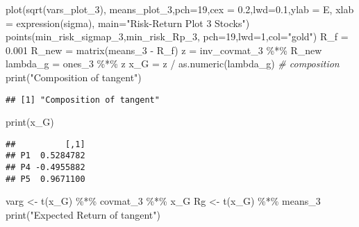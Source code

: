 \documentclass[
]{article}
\newenvironment{Shaded}{\begin{snugshade}}{\end{snugshade}}
\newcommand{\AttributeTok}[1]{\textcolor[rgb]{0.77,0.63,0.00}{#1}}
\newcommand{\CommentTok}[1]{\textcolor[rgb]{0.56,0.35,0.01}{\textit{#1}}}
\newcommand{\DecValTok}[1]{\textcolor[rgb]{0.00,0.00,0.81}{#1}}
\newcommand{\FloatTok}[1]{\textcolor[rgb]{0.00,0.00,0.81}{#1}}
\newcommand{\FunctionTok}[1]{\textcolor[rgb]{0.00,0.00,0.00}{#1}}
\newcommand{\NormalTok}[1]{#1}
\newcommand{\OtherTok}[1]{\textcolor[rgb]{0.56,0.35,0.01}{#1}}
\newcommand{\SpecialCharTok}[1]{\textcolor[rgb]{0.00,0.00,0.00}{#1}}
\newcommand{\StringTok}[1]{\textcolor[rgb]{0.31,0.60,0.02}{#1}}
\begin{document}
\begin{Shaded}
\begin{Highlighting}[]
\FunctionTok{plot}\NormalTok{(}\FunctionTok{sqrt}\NormalTok{(vars\_plot\_3), means\_plot\_3,}\AttributeTok{pch=}\DecValTok{19}\NormalTok{,}\AttributeTok{cex =} \FloatTok{0.2}\NormalTok{,}\AttributeTok{lwd=}\FloatTok{0.1}\NormalTok{,}\AttributeTok{ylab =} \StringTok{\textquotesingle{}E\textquotesingle{}}\NormalTok{, }\AttributeTok{xlab =} \FunctionTok{expression}\NormalTok{(sigma), }\AttributeTok{main=}\StringTok{"Risk{-}Return Plot 3 Stocks"}\NormalTok{) }
\FunctionTok{points}\NormalTok{(min\_risk\_sigmap\_3,min\_risk\_Rp\_3, }\AttributeTok{pch=}\DecValTok{19}\NormalTok{,}\AttributeTok{lwd=}\DecValTok{1}\NormalTok{,}\AttributeTok{col=}\StringTok{"gold"}\NormalTok{)}
\NormalTok{R\_f }\OtherTok{=} \FloatTok{0.001}
\NormalTok{R\_new }\OtherTok{=} \FunctionTok{matrix}\NormalTok{(means\_3 }\SpecialCharTok{{-}}\NormalTok{ R\_f)}
\NormalTok{z }\OtherTok{=}\NormalTok{ inv\_covmat\_3 }\SpecialCharTok{\%*\%}\NormalTok{ R\_new}
\NormalTok{lambda\_g }\OtherTok{=}\NormalTok{ ones\_3 }\SpecialCharTok{\%*\%}\NormalTok{ z}
\NormalTok{x\_G }\OtherTok{=}\NormalTok{ z }\SpecialCharTok{/} \FunctionTok{as.numeric}\NormalTok{(lambda\_g) }\CommentTok{\# composition}
\FunctionTok{print}\NormalTok{(}\StringTok{"Composition of tangent"}\NormalTok{)}
\end{Highlighting}
\end{Shaded}

\begin{verbatim}
## [1] "Composition of tangent"
\end{verbatim}

\begin{Shaded}
\begin{Highlighting}[]
\FunctionTok{print}\NormalTok{(x\_G)}
\end{Highlighting}
\end{Shaded}

\begin{verbatim}
##          [,1]
## P1  0.5284782
## P4 -0.4955882
## P5  0.9671100
\end{verbatim}

\begin{Shaded}
\begin{Highlighting}[]
\NormalTok{varg }\OtherTok{\textless{}{-}} \FunctionTok{t}\NormalTok{(x\_G) }\SpecialCharTok{\%*\%}\NormalTok{ covmat\_3 }\SpecialCharTok{\%*\%}\NormalTok{ x\_G }
\NormalTok{Rg }\OtherTok{\textless{}{-}} \FunctionTok{t}\NormalTok{(x\_G) }\SpecialCharTok{\%*\%}\NormalTok{ means\_3 }
\FunctionTok{print}\NormalTok{(}\StringTok{"Expected Return of tangent"}\NormalTok{)}
\end{Highlighting}
\end{Shaded}
\end{document}
